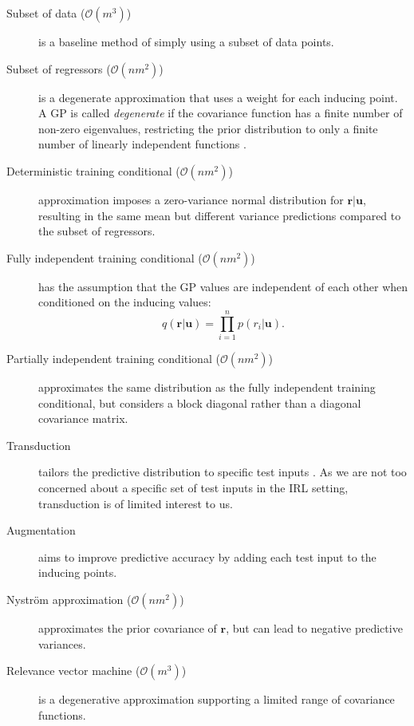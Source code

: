 \documentclass{mprop}
\theoremstyle{definition}
\begin{document}
\begin{description}
  \item [Subset of data ($\mathcal{O}(m^3)$)] is a baseline method of simply
    using a subset of data points.
  \item [Subset of regressors ($\mathcal{O}(nm^2)$)
    \cite{silverman1985some,DBLP:conf/nips/SmolaB00,DBLP:conf/nips/WahbaLGXKK98}]
    is a degenerate approximation that uses a weight for each inducing point. A
    GP is called \emph{degenerate} if the covariance function has a finite
    number of non-zero eigenvalues, restricting the prior distribution to only a
    finite number of linearly independent functions
    \cite{DBLP:journals/jmlr/CandelaR05}.
  \item [Deterministic training conditional ($\mathcal{O}(nm^2)$)
    \cite{DBLP:conf/aistats/SeegerWL03}] approximation imposes a zero-variance
    normal distribution for $\mathbf{r} | \mathbf{u}$, resulting in the same mean
    but different variance predictions compared to the subset of regressors.
  \item [Fully independent training conditional ($\mathcal{O}(nm^2)$)
    \cite{DBLP:conf/nips/SnelsonG05}] has the assumption that the GP values are
    independent of each other when conditioned on the inducing values:
    \[ q(\mathbf{r} | \mathbf{u}) = \prod_{i=1}^n p(r_i | \mathbf{u}). \]
  \item [Partially independent training conditional ($\mathcal{O}(nm^2)$)
    \cite{DBLP:journals/neco/Tresp00,DBLP:conf/nips/SchwaighoferT02}]
    approximates the same distribution as the fully independent training
    conditional, but considers a block diagonal rather than a diagonal
    covariance matrix.
  \item [Transduction] tailors the predictive distribution to
    specific test inputs \cite{DBLP:journals/jmlr/CandelaR05}. As we are not too
    concerned about a specific set of test inputs in the IRL setting,
    transduction is of limited interest to us.
  \item [Augmentation \cite{rasmussen2002reduced}] aims to improve predictive
    accuracy by adding each test input to the inducing points.
  \item [Nystr\"{o}m approximation ($\mathcal{O}(nm^2)$)
    \cite{DBLP:conf/nips/WilliamsS00}] approximates the prior covariance of
    $\mathbf{r}$, but can lead to negative predictive variances.
  \item [Relevance vector machine ($\mathcal{O}(m^3)$)
    \cite{DBLP:journals/jmlr/Tipping01}] is a degenerative approximation
    supporting a limited range of covariance functions.
\end{description}
\end{document}
